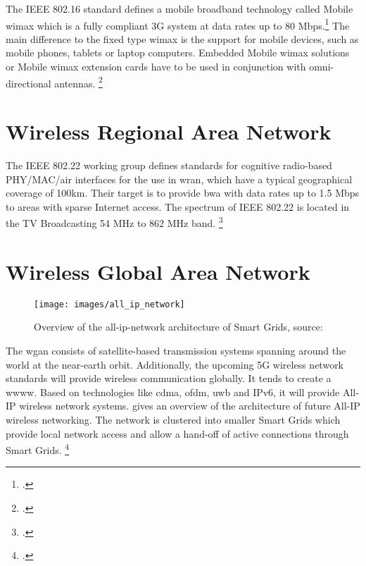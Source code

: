 The IEEE 802.16 standard defines a mobile broadband technology called Mobile \gls{wimax} which is a fully compliant 3G system at data rates up to 80 Mbps.\footcite[Cf.][2-3]{Kirmse2009} The main difference to the fixed type \gls{wimax} is the support for mobile devices, such as mobile phones, tablets or laptop computers. Embedded Mobile \gls{wimax} solutions or Mobile \gls{wimax} extension cards have to be used in conjunction with omni-directional antennas. \footcite[Cf.][3--4]{Kirmse2009}

\section{Wireless Regional Area Network}

The IEEE 802.22 working group defines standards for cognitive radio-based PHY/MAC/air interfaces for the use in \gls{wran}, which have a typical geographical coverage of 100km. Their target is to provide \gls{bwa} with data rates up to 1.5 Mbps to areas with sparse Internet access. The spectrum of IEEE 802.22 is located in the TV Broadcasting 54 MHz to 862 MHz band. \footcite[Cf.][2]{Romme2008}

\section{Wireless Global Area Network}

\begin{figure}[ht]
  \centering
  \texttt{[image: images/all\_ip\_network]}
  \caption{Overview of the all-ip-network architecture of Smart Grids, source: \cite{mulligan}}
  \label{fig:all_ip}
\end{figure}

The \gls{wgan} consists of satellite-based transmission systems spanning around the world at the near-earth orbit. Additionally, the upcoming 5G wireless network standards will provide wireless communication globally. It tends to create a \gls{wwww}. Based on technologies like \gls{cdma}, \gls{ofdm}, \gls{uwb} and IPv6, it will provide All-IP wireless network systems.  gives an overview of the architecture of future All-IP wireless networking. The network is clustered into smaller Smart Grids which provide local network access and allow a hand-off of active connections through Smart Grids. \footcite[Cf.][]{Lin2005}
